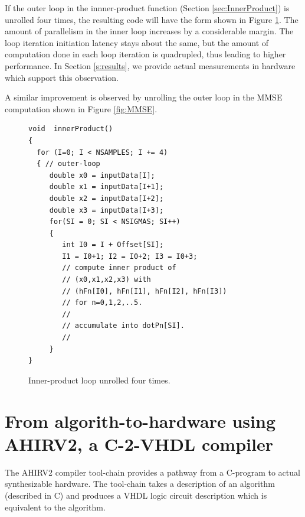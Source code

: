 \documentclass[conference]{IEEEtran}
\begin{document}
If the outer loop in the innner-product function
(Section \ref{sec:InnerProduct}) is unrolled four times, the 
resulting code will have the form shown in Figure \ref{fig:InnerProductUnrolled}.
The amount of parallelism in the inner loop increases by a considerable
margin.  The loop iteration initiation latency stays about the same, but the
amount of computation done in each loop iteration is quadrupled, thus
leading to higher performance.  In Section \ref{s:results}, we
provide actual measurements in hardware which support this observation.

A similar improvement is observed by unrolling the outer loop in the MMSE computation
shown in Figure \ref{fig:MMSE}.

\begin{figure}
\begin{centering}
\small\begin{verbatim}
void  innerProduct()
{
  for (I=0; I < NSAMPLES; I += 4)
  { // outer-loop
     double x0 = inputData[I];
     double x1 = inputData[I+1];
     double x2 = inputData[I+2];
     double x3 = inputData[I+3];
     for(SI = 0; SI < NSIGMAS; SI++)
     { 
        int I0 = I + Offset[SI];
        I1 = I0+1; I2 = I0+2; I3 = I0+3;
        // compute inner product of 
        // (x0,x1,x2,x3) with
        // (hFn[I0], hFn[I1], hFn[I2], hFn[I3])
        // for n=0,1,2,..5.
        // 
        // accumulate into dotPn[SI].
        //
     }
}
\end{verbatim}
\normalsize
\end{centering}
\caption{Inner-product loop unrolled four times.}
\label{fig:InnerProductUnrolled}
\end{figure}


\section{From algorith-to-hardware using AHIRV2, a C-2-VHDL compiler} \label{s:AHIRV2}
The AHIRV2 compiler tool-chain \cite{c:ahir_thesis2009, c:ahir_dsd2010, c:ahir_usenix2012} 
provides a pathway from a C-program to actual synthesizable hardware.  The tool-chain
takes a description of an algorithm (described in C) and produces a VHDL logic circuit
description which is equivalent to the algorithm.
\end{document}
